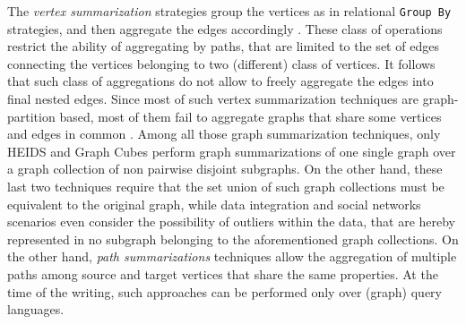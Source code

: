 The \textit{vertex summarization} strategies  group the vertices as in relational \texttt{Group By} strategies, and then aggregate the edges accordingly \cite{JunghannsPR17}. These class of operations restrict the ability of aggregating by paths, that are limited to the set of edges connecting the vertices belonging to two (different) class of vertices. It follows that such class of aggregations   do not allow to freely aggregate the edges into final nested edges. Since most of such vertex summarization techniques are graph-partition based, most of them fail to aggregate graphs that share some vertices and edges in common \cite{yin,Tian20085,jakawat}. Among all those graph summarization techniques, only HEIDS \cite{ChengJQ16} and Graph Cubes \cite{Zhao11} perform graph summarizations of one single graph over a graph collection of non pairwise disjoint subgraphs. On the other hand, these last two techniques require that the set union of such graph collections must be equivalent to the original graph, while data integration and social networks scenarios even consider the possibility of outliers within the data, that are hereby represented in no subgraph belonging to the aforementioned graph collections. %
On the other hand, \textit{path summarizations} techniques  allow the aggregation of multiple paths  among source and target vertices that share the same properties. At the time of the writing, such approaches can be performed only over (graph) query languages.


